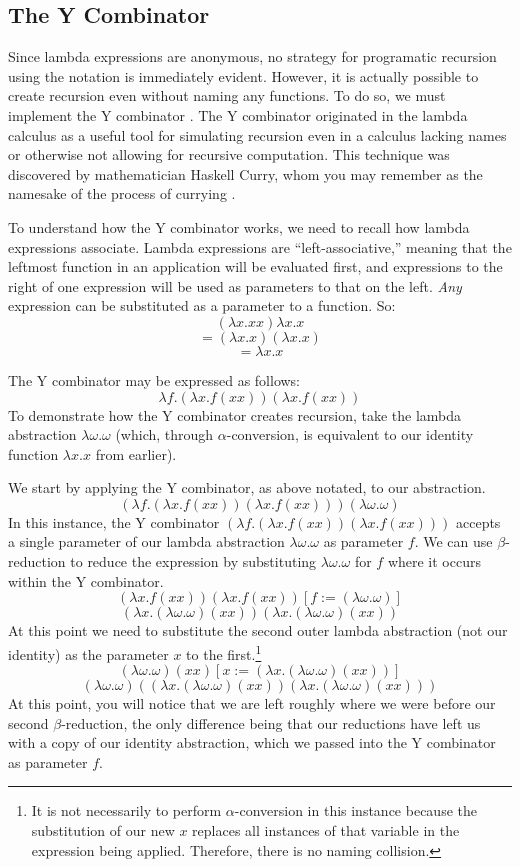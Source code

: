 \documentclass[twocolumn,titlepage,12pt]{article}
\begin{document}
\subsection{The Y Combinator}
Since lambda expressions are anonymous, no strategy for programatic recursion using the notation is immediately evident. However, it is actually possible to create recursion even without naming any functions. To do so, we must implement the Y combinator \cite{ycombmedium}. The Y combinator originated in the lambda calculus as a useful tool for simulating recursion even in a calculus lacking names or otherwise not allowing for recursive computation. This technique was discovered by mathematician Haskell Curry, whom you may remember as the namesake of the process of currying \cite{compphileyc}.

To understand how the Y combinator works, we need to recall how lambda expressions associate. Lambda expressions are ``left-associative,'' meaning that the leftmost function in an application will be evaluated first, and expressions to the right of one expression will be used as parameters to that on the left. \textit{Any} expression can be substituted as a parameter to a function. So:
$$(\lambda x.xx)\lambda x.x$$
$$=(\lambda x.x)(\lambda x.x)$$
$$=\lambda x.x$$

The Y combinator may be expressed as follows:
$$\lambda f.(\lambda x.f(x x))(\lambda x.f(x x))$$
To demonstrate how the Y combinator creates recursion, take the lambda abstraction $\lambda \omega.\omega$ (which, through $\alpha$-conversion, is equivalent to our identity function $\lambda x.x$ from earlier).

We start by applying the Y combinator, as above notated, to our abstraction.
$$(\lambda f.(\lambda x.f(x x))(\lambda x.f(x x)))(\lambda \omega.\omega)$$
In this instance, the Y combinator $(\lambda f.(\lambda x.f(x x))(\lambda x.f(x x)))$ accepts a single parameter of our lambda abstraction $\lambda \omega.\omega$ as parameter $f$. We can use $\beta$-reduction to reduce the expression by substituting $\lambda \omega.\omega$ for $f$ where it occurs within the Y combinator.
$$(\lambda x.f(x x))(\lambda x.f(x x))[f:=(\lambda \omega.\omega)]$$
$$(\lambda x.(\lambda \omega.\omega)(x x))(\lambda x.(\lambda \omega.\omega)(x x))$$
At this point we need to substitute the second outer lambda abstraction (not our identity) as the parameter $x$ to the first.\footnote{It is not necessarily to perform $\alpha$-conversion in this instance because the substitution of our new $x$ replaces all instances of that variable in the expression being applied. Therefore, there is no naming collision.}
$$(\lambda \omega.\omega)(x x)[x:=(\lambda x.(\lambda \omega.\omega)(x x))]$$
$$(\lambda \omega.\omega)((\lambda x.(\lambda \omega.\omega)(x x))(\lambda x.(\lambda \omega.\omega)(x x)))$$
At this point, you will notice that we are left roughly where we were before our second $\beta$-reduction, the only difference being that our reductions have left us with a copy of our identity abstraction, which we passed into the Y combinator as parameter $f$.
\end{document}
